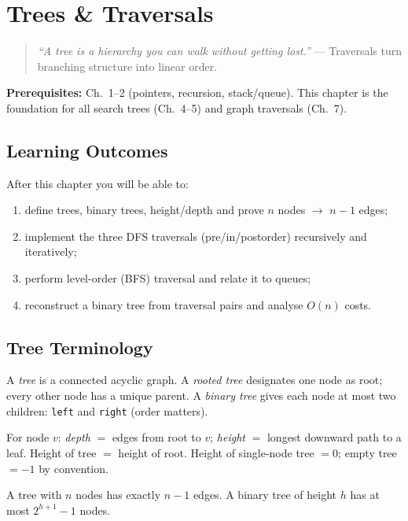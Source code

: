 \chapter{Trees \& Traversals}
\label{ch:trees-traversals}

\begin{quote}
\emph{``A tree is a hierarchy you can walk without getting lost.''} --- Traversals turn branching structure into linear order.
\end{quote}

\noindent\textbf{Prerequisites:} Ch.~1--2 (pointers, recursion, stack/queue). This chapter is the foundation for all search trees (Ch.~4--5) and graph traversals (Ch.~7).

\section*{Learning Outcomes}
After this chapter you will be able to:
\begin{enumerate}[label=(L\arabic*)]
    \item define trees, binary trees, height/depth and prove $n$ nodes $\to$ $n-1$ edges;
    \item implement the three DFS traversals (pre/in/postorder) recursively and iteratively;
    \item perform level-order (BFS) traversal and relate it to queues;
    \item reconstruct a binary tree from traversal pairs and analyse $O(n)$ costs.
\end{enumerate}

\section{Tree Terminology}
\label{sec:tree-terms}
A \emph{tree} is a connected acyclic graph. A \emph{rooted tree} designates one node as root; every other node has a unique parent. A \emph{binary tree} gives each node at most two children: \texttt{left} and \texttt{right} (order matters).

For node $v$: \emph{depth} $=$ edges from root to $v$; \emph{height} $=$ longest downward path to a leaf. Height of tree $=$ height of root. Height of single-node tree $=0$; empty tree $=-1$ by convention.

\begin{theorem}
A tree with $n$ nodes has exactly $n-1$ edges. A binary tree of height $h$ has at most $2^{h+1}-1$ nodes.
\end{theorem}

